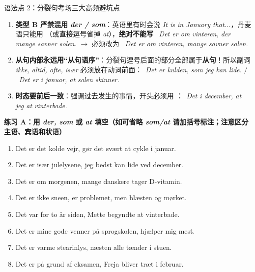 \begin{grammatikbox}{语法点 2：分裂句考场三大高频避坑点}
\begin{enumerate}
  \item \textbf{类型 B 严禁混用 \textit{der / som}}：英语里有时会说 \textit{It is in January that...}，丹麦语只能用 （或直接逗号省掉 \textit{at}），\textbf{绝对不能写} \ \textit{Det er om vinteren, der mange savner solen.} $\rightarrow$ 必须改为 \ \textit{Det er om vinteren,  mange savner solen.}
  \item \textbf{从句内部永远用“从句语序”}：分裂句逗号后面的部分全部属于\textbf{从句}！所以副词 \textit{ikke, altid, ofte, især} 必须放在动词前面：\ \textit{Det er kulden, som jeg  kan lide.} / \ \textit{Det er i januar, at solen  skinner.}
  \item \textbf{时态要前后一致}：强调过去发生的事情，开头必须用 ：\ \textit{Det  i december, at jeg  at vinterbade.}
\end{enumerate}
\end{grammatikbox}


\textbf{练习 A：用 \textit{der, som} 或 \textit{at} 填空（如可省略 \textit{som/at} 请加括号标注；注意区分主语、宾语和状语）}
\begin{enumerate}
  \item Det er det kolde vejr, \underline{\hspace{1.8cm}} gør det svært at cykle i januar.
  \item Det er især julelysene, \underline{\hspace{1.8cm}} jeg bedst kan lide ved december.
  \item Det er om morgenen, \underline{\hspace{1.8cm}} mange danskere tager D-vitamin.
  \item Det er ikke sneen, \underline{\hspace{1.8cm}} er problemet, men blæsten og mørket.
  \item Det var for to år siden, \underline{\hspace{1.8cm}} Mette begyndte at vinterbade.
  \item Det er mine gode venner på sprogskolen, \underline{\hspace{1.8cm}} hjælper mig mest.
  \item Det er varme stearinlys, \underline{\hspace{1.8cm}} næsten alle tænder i stuen.
  \item Det er på grund af eksamen, \underline{\hspace{1.8cm}} Freja bliver træt i februar.
\end{enumerate}

